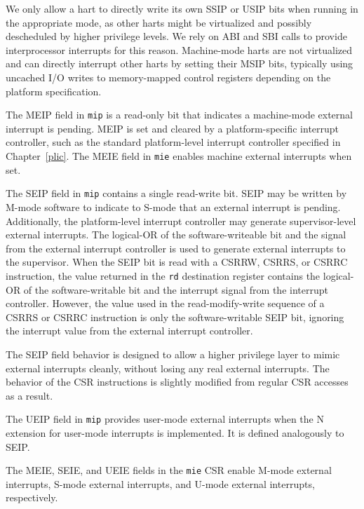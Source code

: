 \begin{commentary}
We only allow a hart to directly write its own SSIP or USIP
bits when running in the appropriate mode, as other harts might be
virtualized and possibly descheduled by higher privilege levels.  We
rely on ABI and SBI calls to provide interprocessor interrupts
for this reason.  Machine-mode harts are not virtualized and can
directly interrupt other harts by setting their MSIP bits, typically
using uncached I/O writes to memory-mapped control registers depending
on the platform specification.
\end{commentary}

The MEIP field in {\tt mip} is a read-only bit that indicates a machine-mode
external interrupt is pending.  MEIP is set and cleared by a platform-specific
interrupt controller, such as the standard platform-level interrupt controller
specified in Chapter~\ref{plic}.  The MEIE field in {\tt mie} enables machine
external interrupts when set.

The SEIP field in {\tt mip} contains a single read-write bit.  SEIP
may be written by M-mode software to indicate to S-mode that an
external interrupt is pending.  Additionally, the platform-level
interrupt controller may generate supervisor-level external interrupts.  The
logical-OR of the software-writeable bit and the signal from the
external interrupt controller is used to generate external interrupts
to the supervisor.  When the SEIP bit is read with a CSRRW, CSRRS, or
CSRRC instruction, the value returned in the {\tt rd} destination
register contains the logical-OR of the software-writable bit and the
interrupt signal from the interrupt controller.  However, the value
used in the read-modify-write sequence of a CSRRS or CSRRC instruction
is only the software-writable SEIP bit, ignoring the interrupt value
from the external interrupt controller.

\begin{commentary}
  The SEIP field behavior is designed to allow a higher privilege
  layer to mimic external interrupts cleanly, without losing any real
  external interrupts.  The behavior of the CSR instructions is
  slightly modified from regular CSR accesses as a result.
\end{commentary}

The UEIP field in {\tt mip} provides user-mode external interrupts when the
N extension for user-mode interrupts is implemented.  It is defined
analogously to SEIP.

The MEIE, SEIE, and UEIE fields in the {\tt mie} CSR enable M-mode external
interrupts, S-mode external interrupts, and U-mode external interrupts,
respectively.

